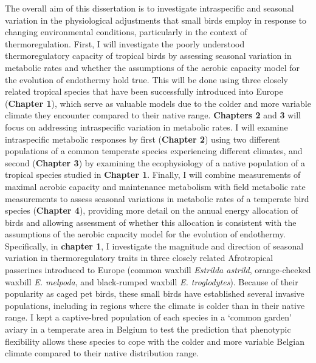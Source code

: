 \documentclass[10pt, twoside]{book} %
\begin{document}
\noindent The overall aim of this dissertation is to investigate intraspecific and seasonal variation in the physiological adjustments that small birds employ in response to changing environmental conditions, particularly in the context of thermoregulation. First, I will investigate the poorly understood thermoregulatory capacity of tropical birds by assessing seasonal variation in metabolic rates and whether the assumptions of the aerobic capacity model for the evolution of endothermy hold true. This will be done using three closely related tropical species that have been successfully introduced into Europe (\textbf{Chapter 1}), which serve as valuable models due to the colder and more variable climate they encounter compared to their native range. \textbf{Chapters 2} and \textbf{3} will focus on addressing intraspecific variation in metabolic rates. I will examine intraspecific metabolic responses by first (\textbf{Chapter 2}) using two different populations of a common temperate species experiencing different climates, and second (\textbf{Chapter 3}) by examining the ecophysiology of a native population of a tropical species studied in \textbf{Chapter 1}. Finally, I will combine measurements of maximal aerobic capacity and maintenance metabolism with field metabolic rate measurements to assess seasonal variations in metabolic rates of a temperate bird species (\textbf{Chapter 4}), providing more detail on the annual energy allocation of birds and allowing assessment of whether this allocation is consistent with the assumptions of the aerobic capacity model for the evolution of endothermy. \\

Specifically, in \textbf{chapter 1}, I investigate the magnitude and direction of seasonal variation in thermoregulatory traits in three closely related Afrotropical passerines introduced to Europe (common waxbill \textit{Estrilda astrild}, orange-cheeked waxbill \textit{E. melpoda}, and black-rumped waxbill \textit{E. troglodytes}). Because of their popularity as caged pet birds, these small birds have established several invasive populations, including in regions where the climate is colder than in their native range. I kept a captive-bred population of each species in a ‘common garden’ aviary in a temperate area in Belgium to test the prediction that phenotypic flexibility allows these species to cope with the colder and more variable Belgian climate compared to their native distribution range.\\
\end{document}
